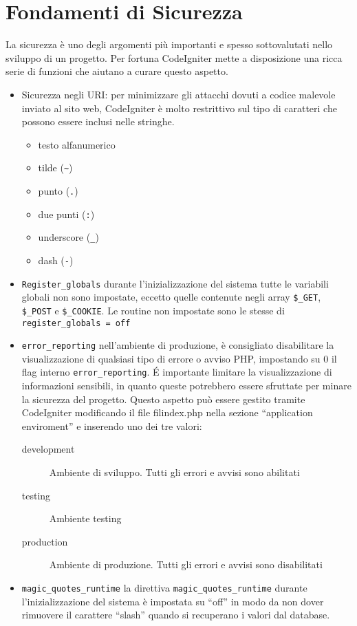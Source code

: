 \section{Fondamenti di Sicurezza}
\label{cap:sicurezza}

La sicurezza è uno degli argomenti più importanti e spesso sottovalutati nello sviluppo di un progetto. Per fortuna CodeIgniter mette a disposizione una ricca serie di funzioni che aiutano a curare questo aspetto.

\begin{itemize}
\item Sicurezza negli URI: per minimizzare gli attacchi dovuti a codice malevole inviato al sito web, CodeIgniter è molto restrittivo sul tipo di caratteri che possono essere inclusi nelle stringhe.

\begin{itemize}
\item testo alfanumerico
\item tilde (\verb|~|)
\item punto (\verb|.|)
\item due punti (\verb|:|)
\item underscore (\verb|_|)
\item dash (\verb|-|)
\end{itemize}

\item \verb|Register_globals| durante l'inizializzazione del sistema tutte le variabili globali non sono impostate, eccetto quelle contenute negli array \verb|$_GET|, \verb|$_POST| e \verb|$_COOKIE|. Le routine non impostate sono le stesse di \verb|register_globals = off|

\item \verb|error_reporting| nell'ambiente di produzione, è consigliato disabilitare la visualizzazione di qualsiasi tipo di errore o avviso \ac{PHP}, impostando su 0 il flag interno  \verb|error_reporting|. \'E importante limitare la visualizzazione di informazioni sensibili, in quanto queste potrebbero essere sfruttate per minare la sicurezza del progetto. Questo aspetto può essere gestito tramite CodeIgniter modificando il file fil{index.php} nella sezione ``application enviroment'' e inserendo uno dei tre valori:

\begin{description}
\item [development] Ambiente di sviluppo. Tutti gli errori e avvisi sono abilitati
\item [testing] Ambiente testing
\item [production] Ambiente di produzione. Tutti gli errori e avvisi sono disabilitati
\end{description}

\item \verb|magic_quotes_runtime| la direttiva \verb|magic_quotes_runtime| durante l'inizializzazione del sistema è impostata su ``off'' in modo da non dover rimuovere il carattere ``slash'' quando si recuperano i valori dal database.
\end{itemize}


